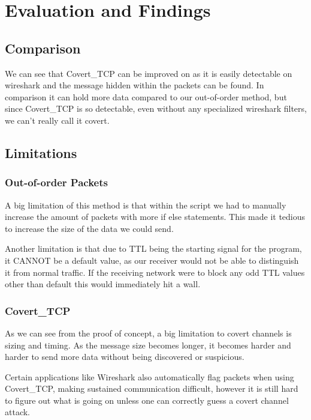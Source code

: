 \documentclass[letterpaper,twocolumn,10pt]{article}
\begin{document}
\section{Evaluation and Findings}

\subsection{Comparison}

We can see that Covert\_TCP can be improved on as it is easily detectable on wireshark and the message hidden within the packets can be found. In comparison it can hold more data compared to our out-of-order method, but since Covert\_TCP is so detectable, even without any specialized wireshark filters, we can’t really call it covert.


\subsection{Limitations}

\subsubsection{Out-of-order Packets}

A big limitation of this method is that within the script we had to manually increase the amount of packets with more if else statements. This made it tedious to increase the size of the data we could send.

Another limitation is that due to TTL being the starting signal for the program, it CANNOT be a default value, as our receiver would not be able to distinguish it from normal traffic. If the receiving network were to block any odd TTL values other than default this would immediately hit a wall.

\subsubsection{Covert\_TCP}

As we can see from the proof of concept, a big limitation to covert channels is sizing and timing. As the message size becomes longer, it becomes harder and harder to send more data without being discovered or suspicious.

Certain applications like Wireshark also automatically flag packets when using Covert\_TCP, making sustained communication difficult, however it is still hard to figure out what is going on unless one can correctly guess a covert channel attack.
\end{document}
